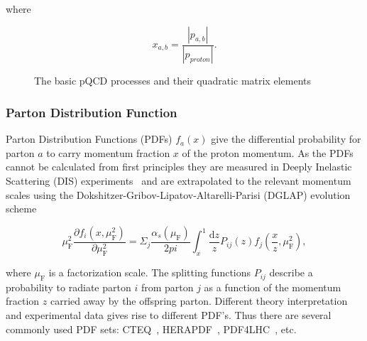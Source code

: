 \noindent where 

\begin{equation}
x_{a,b} = \frac{\left| p_{a,b} \right|}{\left| p_{proton} \right|}.
\end{equation}

%



\begin{figure}[htb]
\centering

\caption[QCD Leading Order]{The basic pQCD processes and their quadratic matrix elements}
\label{fig:qcdlo}
\end{figure}



\subsubsection*{Parton Distribution Function}
Parton Distribution Functions (PDFs) $f_a\left(x\right)$ give the differential probability for parton $a$ to carry momentum fraction $x$ of the proton momentum. %
As the PDFs cannot be calculated from first principles they are measured in Deeply Inelastic Scattering (DIS) experiments~\cite{missing} and are extrapolated to the relevant momentum scales using the Dokshitzer-Gribov-Lipatov-Altarelli-Parisi (DGLAP) evolution scheme ~\cite{Gribov:1972ri,Altarelli:1977zs,Dokshitzer:1977sg}  %

\begin{equation}
\mu_\mathrm{F}^2 \frac{\partial f_i\left(x,\mu_{\mathrm{F}}^2 \right)}{\partial \mu_{\mathrm{F}}^2} = \Sigma_j \frac{\alpha_s\left(\mu_{\mathrm{F}}\right)}{2{pi}} \int _x^1 \frac{\mathrm{d}z}{z} P_{ij}(z) f_j\left(\frac{x}{z},\mu_{\mathrm{F}}^2\right),
\label{eq:dglap}
\end{equation}



\noindent where $\mu_{\mathrm{F}}$ is a factorization scale. The splitting functions $P_{ij}$ describe a probability to radiate parton $i$ from parton $j$ as a function of the momentum fraction $z$ carried away by the offspring parton. Different theory interpretation and experimental data gives rise to different PDF's. Thus there are several commonly used PDF sets: CTEQ~\cite{cteq}, HERAPDF~\cite{CooperSarkar:2011aa}, PDF4LHC~\cite{Butterworth:2015oua}, etc. %

